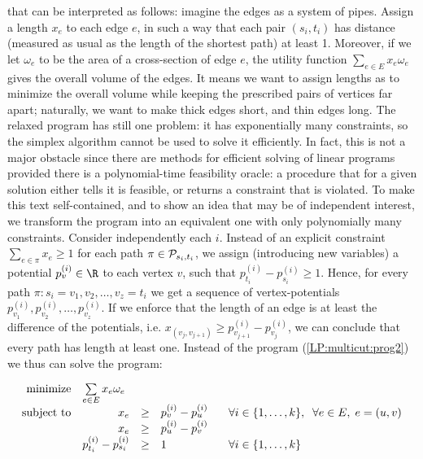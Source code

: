 \noindent
that can be interpreted as follows: imagine the edges as a system of pipes. 
Assign a length $x_e$ to each edge $e$, in  such a way that each pair $(s_i,t_i)$
has distance (measured as usual as the length of the shortest path) 
at least 1. Moreover, if we let $\omega_e$ to be the area of a cross-section of edge $e$, 
the utility function $\sum_{e\in E}x_e\omega_e$ gives the overall volume of the edges. It means we
want to assign lengths as to minimize the overall volume while keeping the prescribed pairs of vertices
far apart; naturally, we want to make thick edges short, and thin edges long.
The relaxed program has still one problem: it has exponentially many constraints, so the simplex algorithm 
cannot be used to solve it efficiently. In fact, this is not a major obstacle since there are methods 
for efficient solving of linear programs provided there is a polynomial-time feasibility oracle: a procedure that 
for a given solution either tells it is feasible, or returns a constraint that is violated. 
To make this text self-contained, and to show an idea that may be of independent interest,
we transform the program into an equivalent one with only polynomially many constraints.
Consider independently each $i$. Instead of an explicit constraint $\sum_{e\in\pi}x_e\ge1$ for
each path $\pi\in{\cal P}_{s_i,t_i}$, we assign (introducing new variables) a potential  $p_v^{(i)}\in\R$
to each vertex $v$, such that $p_{t_i}^{(i)}-p_{s_i}^{(i)}\ge1$. Hence, for every path
$\pi: s_i=v_1,v_2,\ldots,v_z=t_i$ we get a sequence of vertex-potentials  
$p_{v_1}^{(i)},p_{v_2}^{(i)},\ldots,p_{v_z}^{(i)}$. If we enforce that the length of an edge is 
at least the difference of the potentials, i.e. $x_{(v_j,v_{j+1})}\ge p_{v_{j+1}}^{(i)}-p_{v_j}^{(i)}$,
we can conclude that every path has length at least one. Instead of the program (\ref{LP:multicut:prog2})
we thus can solve the program:

\begin{equation}
\label{LP:multicut:prog3}
\begin{array}{rrcll}
  {\rm minimize}     & \multicolumn{1}{l}{ \sum\limits_{e\in E}x_e\omega_e}\\
  {\rm subject\ to} & x_e&\ge&p_v^{(i)}-p_u^{(i)}& \;\;\;
                              \forall i\in\{1,\ldots,k\},\;\; \forall e\in E, \;e=(u,v)\\
                          & x_e&\ge&p_u^{(i)}-p_v^{(i)}\\
                          & p_{t_i}^{(i)}-p_{s_i}^{(i)}&\ge&1& \;\;\;
                              \forall i\in\{1,\ldots,k\}\\
\end{array}
\end{equation}

